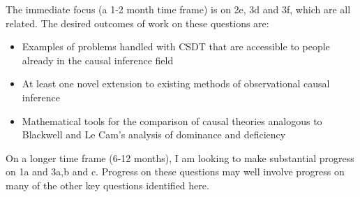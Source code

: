 The immediate focus (a 1-2 month time frame) is on 2e, 3d and 3f, which are all related. The desired outcomes of work on these questions are:
\begin{itemize}
	\item Examples of problems handled with CSDT that are accessible to people already in the causal inference field
	\item At least one novel extension to existing methods of observational causal inference
	\item Mathematical tools for the comparison of causal theories analogous to Blackwell and Le Cam's analysis of dominance and deficiency \cite{le_cam_comparison_1996}
\end{itemize}

On a longer time frame (6-12 months), I am looking to make substantial progress on 1a and 3a,b and c. Progress on these questions may well involve progress on many of the other key questions identified here.
